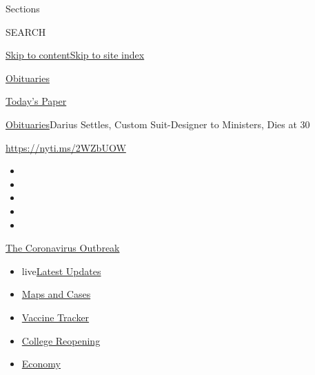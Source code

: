Sections

SEARCH

\protect\hyperlink{site-content}{Skip to
content}\protect\hyperlink{site-index}{Skip to site index}

\href{https://www.nytimes.com/section/obituaries}{Obituaries}

\href{https://myaccount.nytimes.com/auth/login?response_type=cookie\&client_id=vi}{}

\href{https://www.nytimes.com/section/todayspaper}{Today's Paper}

\href{/section/obituaries}{Obituaries}\textbar{}Darius Settles, Custom
Suit-Designer to Ministers, Dies at 30

\url{https://nyti.ms/2WZbUOW}

\begin{itemize}
\item
\item
\item
\item
\item
\end{itemize}

\href{https://www.nytimes.com/news-event/coronavirus?action=click\&pgtype=Article\&state=default\&region=TOP_BANNER\&context=storylines_menu}{The
Coronavirus Outbreak}

\begin{itemize}
\tightlist
\item
  live\href{https://www.nytimes.com/2020/08/03/world/coronavirus-covid-19.html?action=click\&pgtype=Article\&state=default\&region=TOP_BANNER\&context=storylines_menu}{Latest
  Updates}
\item
  \href{https://www.nytimes.com/interactive/2020/us/coronavirus-us-cases.html?action=click\&pgtype=Article\&state=default\&region=TOP_BANNER\&context=storylines_menu}{Maps
  and Cases}
\item
  \href{https://www.nytimes.com/interactive/2020/science/coronavirus-vaccine-tracker.html?action=click\&pgtype=Article\&state=default\&region=TOP_BANNER\&context=storylines_menu}{Vaccine
  Tracker}
\item
  \href{https://www.nytimes.com/2020/08/02/us/covid-college-reopening.html?action=click\&pgtype=Article\&state=default\&region=TOP_BANNER\&context=storylines_menu}{College
  Reopening}
\item
  \href{https://www.nytimes.com/live/2020/08/03/business/stock-market-today-coronavirus?action=click\&pgtype=Article\&state=default\&region=TOP_BANNER\&context=storylines_menu}{Economy}
\end{itemize}

